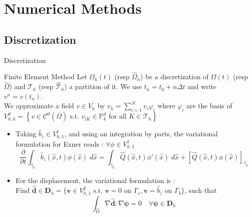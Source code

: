 \section{Numerical Methods}
\subsection{Discretization}

\begin{frame}{Discretization}
  \begin{block}{Finite Element Method}
    Let $\Omega_h(t)$ (resp $\widehat{\Omega}_h$) be a discretization of $\Omega(t)$ (resp $\widehat{\Omega}$) and $\mathcal{T}_h$ (resp $\widehat{\mathcal{T}}_h$) a partition of it. We use $t_n = t_0+n\Delta t$ and write $v^n=v(t_n)$.\\
    We approximate a field $v\in V_h$ by $v_h=\sum_{i=1}^N v_i\varphi_i$ where $\varphi_i$ are the basis of $V_{h,k}^d=\left\{ v \in \mathcal{C}^0 \left( \overline{\Omega} \right) \text{ s.t. } v_{|K} \in  \mathbb{P}_k^d \text{ for all } K \in \mathcal{T}_h  \right\}$
  \end{block}
  \begin{itemize}
  \item
    Taking $\widehat{b}_z\in V_{h,1}^1$, and using an integration by parts, the variational formulation for Exner reads : $\forall \phi\in V_{h,1}^1$
    \begin{equation*}
      \frac{\partial }{\partial t} \int_{\hat{\gamma}_b} \hat{b}_z(\hat{x},t)\phi(\hat{x}) \; d\hat{x}
      = \int_{\hat{\gamma}_b}  \hat{Q}(\hat{x},t) \phi'(\hat{x}) \; d\hat{x}
      + \left[  \hat{Q}(\hat{x},t) \phi(\hat{x} )\right]_{\hat{\gamma}_b}
    \end{equation*}
  \item
    For the displacement, the variational formulation is :\\
    Find $\widehat{\mathbf{d}}\in \mathbf{D}_h = \{ \mathbf{v}\in V_{h,1}^2\text{ s.t. } \mathbf{v}=0\text{ on } \Gamma_s, \mathbf{v}=\widehat{b}_z \text{ on } \Gamma_b \}$, such that
    \begin{equation*}
      \int_{\widehat{\Omega}} \nabla\widehat{\mathbf{d}} : \nabla\bm{\psi} = 0 \quad \forall \bm{\psi}\in \mathbf{D}_h
    \end{equation*}
  \end{itemize}
\end{frame}

